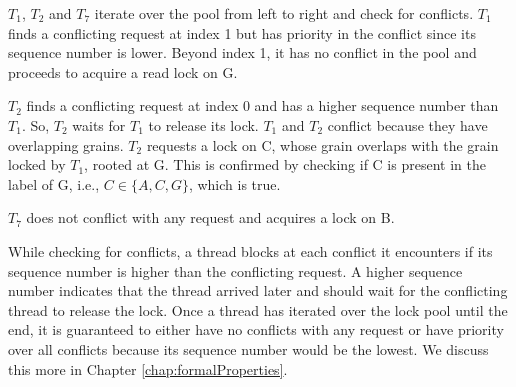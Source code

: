 $T_1$, $T_2$ and $T_7$ iterate over the pool from left to right and check for conflicts. $T_1$ finds a conflicting request at index 1 but has priority in the conflict since its sequence number is lower. Beyond index 1, it has no conflict in the pool and proceeds to acquire a read lock on G.

$T_2$ finds a conflicting request at index 0 and has a higher sequence number than $T_1$. So, $T_2$ waits for $T_1$ to release its lock. $T_1$ and $T_2$ conflict because they have overlapping grains. $T_2$ requests a lock on C, whose grain overlaps with the grain locked by $T_1$, rooted at G. This is confirmed by checking if C is present in the label of G, i.e., $C \in \{A, C, G\}$, which is true.

$T_7$ does not conflict with any request and acquires a lock on B.



While checking for conflicts, a thread blocks at each conflict it encounters if its sequence number is higher than the conflicting request. A higher sequence number indicates that the thread arrived later and should wait for the conflicting thread to release the lock. 
Once a thread has iterated over the lock pool until the end, it is guaranteed to either have no conflicts with any request or have priority over all conflicts because its sequence number would be the lowest. We discuss this more in Chapter \ref{chap:formalProperties}.




		

